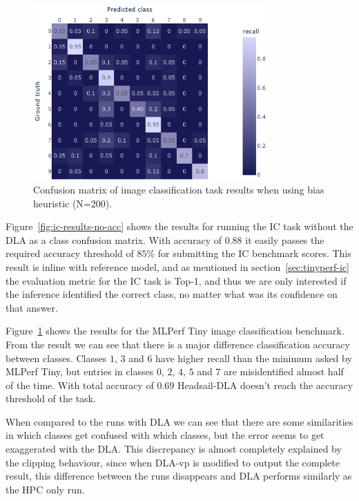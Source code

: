 \documentclass[12pt,a4paper,english
]{tunithesis}
\begin{document}
\begin{figure}[h]
  \centering
  \includegraphics[width=0.8\textwidth]{img/ic_200_abs_heuristic.eps}
  \caption{Confusion matrix of image classification task results when using bias heuristic (N=200).}
  \label{fig:ic-results}
\end{figure}


Figure~\ref{fig:ic-results-no-acc} shows the results for running the IC task without the DLA as a class confusion matrix. With accuracy of $0.88$ it easily passes the
required accuracy threshold of $85\%$ for submitting the IC benchmark scores. This result is inline with reference model, and as mentioned in section~\ref{sec:tinyperf-ic} the evaluation metric for the IC task is Top-1, and thus we are only interested if the inference identified the correct class, no matter what was its confidence on that answer.

Figure~\ref{fig:ic-results} shows the results for the MLPerf Tiny image classification benchmark. From the result we can see that there is a major difference classification accuracy between classes. Classes $1$, $3$ and $6$ have higher recall than the minimum asked by MLPerf Tiny, but entries in classes $0$, $2$, $4$, $5$ and $7$ are misidentified almost half of the time. With total accuracy of $0.69$ Headsail-DLA doesn't reach the accuracy threshold of the task.

When compared to the runs with DLA we can see that there are some similarities in which classes get confused with which classes, but the error seems to get exaggerated with the DLA.
This discrepancy is almost completely explained by the clipping behaviour, since when DLA-vp is modified to output the complete result, this difference between the runs disappears and DLA performs similarly as the HPC only run.
\end{document}
